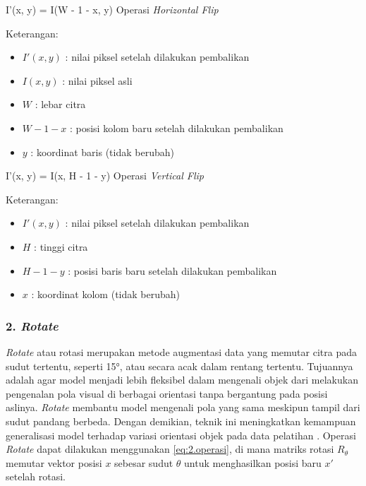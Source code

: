 \vspace{0.5\baselineskip}
\begin{equationcaptioned}[eq:2.HorizontalFlip]{
		I'(x, y) = I(W - 1 - x, y)
	}{
		Operasi \textit{Horizontal Flip}
	}
\end{equationcaptioned}

Keterangan:
\begin{itemize}
\renewcommand\labelitemi{} %
    \item $I'(x, y)$ : nilai piksel setelah dilakukan pembalikan
    \item $I(x, y)$ : nilai piksel asli
    \item $W$ : lebar citra
    \item $W - 1 - x$ : posisi kolom baru setelah dilakukan pembalikan
    \item $y$ : koordinat baris (tidak berubah)
\end{itemize}

\vspace{0.5\baselineskip}
\begin{equationcaptioned}[eq:2.VerticalFlip]{
		I'(x, y) = I(x, H - 1 - y)
	}{
		Operasi \textit{Vertical Flip}
	}
\end{equationcaptioned}

Keterangan:
\begin{itemize}
\renewcommand\labelitemi{} %
    \item $I'(x, y)$ : nilai piksel setelah dilakukan pembalikan
    \item $H$ : tinggi citra
    \item $H - 1 - y$ : posisi baris baru setelah dilakukan pembalikan
    \item $x$ : koordinat kolom (tidak berubah)
\end{itemize}

\subsubsection*{\textnormal{2. \textit{Rotate}}} \label{II.TeoriRotate}
\textit{Rotate} atau rotasi merupakan metode augmentasi data yang memutar citra pada sudut tertentu, seperti 15°, atau secara acak dalam rentang tertentu. Tujuannya adalah agar model menjadi lebih fleksibel dalam mengenali objek dari melakukan pengenalan pola visual di berbagai orientasi tanpa bergantung pada posisi aslinya. \textit{Rotate} membantu model mengenali pola yang sama meskipun tampil dari sudut pandang berbeda. Dengan demikian, teknik ini meningkatkan kemampuan generalisasi model terhadap variasi orientasi objek pada data pelatihan \cite{RotateBatik}. Operasi \textit{Rotate} dapat dilakukan menggunakan \ref{eq:2.operasi}, di mana matriks rotasi ${R}_\theta$ memutar vektor posisi ${x}$ sebesar sudut $\theta$ untuk menghasilkan posisi baru ${x}'$ setelah rotasi.\par

